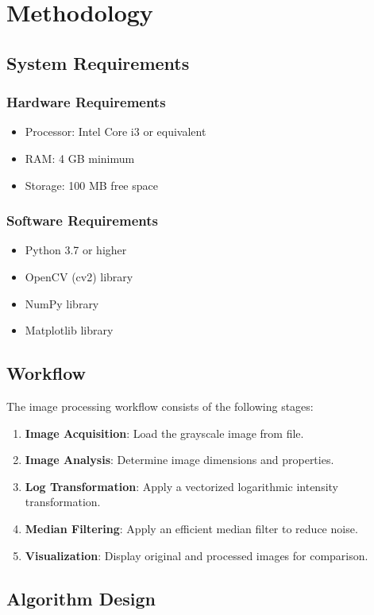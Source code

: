 \documentclass[12pt,a4paper]{article}
\begin{document}
\section{Methodology}
\subsection{System Requirements}
\subsubsection{Hardware Requirements}
\begin{itemize}
    \item Processor: Intel Core i3 or equivalent
    \item RAM: 4 GB minimum
    \item Storage: 100 MB free space
\end{itemize}
\subsubsection{Software Requirements}
\begin{itemize}
    \item Python 3.7 or higher
    \item OpenCV (cv2) library
    \item NumPy library
    \item Matplotlib library
\end{itemize}

\subsection{Workflow}
The image processing workflow consists of the following stages:
\begin{enumerate}
    \item \textbf{Image Acquisition}: Load the grayscale image from file.
    \item \textbf{Image Analysis}: Determine image dimensions and properties.
    \item \textbf{Log Transformation}: Apply a vectorized logarithmic intensity transformation.
    \item \textbf{Median Filtering}: Apply an efficient median filter to reduce noise.
    \item \textbf{Visualization}: Display original and processed images for comparison.
\end{enumerate}

\subsection{Algorithm Design}
\end{document}
